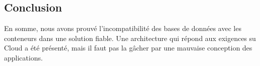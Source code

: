 \begin{onehalfspace}
\section*{Conclusion}
En somme, nous avons prouvé l'incompatibilité des bases de données avec les conteneurs dans une solution fiable. Une architecture qui répond aux exigences su Cloud a été présenté, mais il faut pas la gâcher par une mauvaise conception des applications.

\end{onehalfspace}
